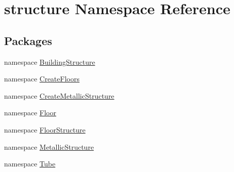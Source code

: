 \hypertarget{namespacestructure}{\section{structure Namespace Reference}
\label{namespacestructure}
}
\subsection*{Packages}
\begin{DoxyCompactItemize}
\item 
namespace \hyperlink{namespacestructure_1_1_building_structure}{Building\-Structure}
\item 
namespace \hyperlink{namespacestructure_1_1_create_floors}{Create\-Floors}
\item 
namespace \hyperlink{namespacestructure_1_1_create_metallic_structure}{Create\-Metallic\-Structure}
\item 
namespace \hyperlink{namespacestructure_1_1_floor}{Floor}
\item 
namespace \hyperlink{namespacestructure_1_1_floor_structure}{Floor\-Structure}
\item 
namespace \hyperlink{namespacestructure_1_1_metallic_structure}{Metallic\-Structure}
\item 
namespace \hyperlink{namespacestructure_1_1_tube}{Tube}
\end{DoxyCompactItemize}

